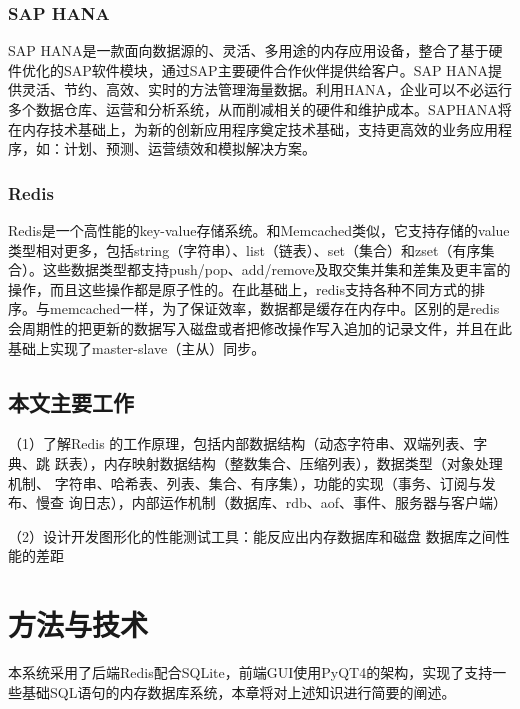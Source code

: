 \documentclass{zjutthesis}
\begin{document}
\subsection{SAP HANA}
SAP HANA是一款面向数据源的、灵活、多用途的内存应用设备，整合了基于硬件优化的SAP软件模块，通过SAP主要硬件合作伙伴提供给客户。SAP HANA提供灵活、节约、高效、实时的方法管理海量数据。利用HANA，企业可以不必运行多个数据仓库、运营和分析系统，从而削减相关的硬件和维护成本。SAPHANA将在内存技术基础上，为新的创新应用程序奠定技术基础，支持更高效的业务应用程序，如：计划、预测、运营绩效和模拟解决方案。

\subsection{Redis}
Redis是一个高性能的key-value存储系统。和Memcached类似，它支持存储的value类型相对更多，包括string（字符串）、list（链表）、set（集合）和zset（有序集合）。这些数据类型都支持push/pop、add/remove及取交集并集和差集及更丰富的操作，而且这些操作都是原子性的。在此基础上，redis支持各种不同方式的排序。与memcached一样，为了保证效率，数据都是缓存在内存中。区别的是redis会周期性的把更新的数据写入磁盘或者把修改操作写入追加的记录文件，并且在此基础上实现了master-slave（主从）同步。

\section{本文主要工作}
（1）了解Redis 的工作原理，包括内部数据结构（动态字符串、双端列表、字典、跳
跃表），内存映射数据结构（整数集合、压缩列表），数据类型（对象处理机制、
字符串、哈希表、列表、集合、有序集），功能的实现（事务、订阅与发布、慢查
询日志），内部运作机制（数据库、rdb、aof、事件、服务器与客户端）

（2）设计开发图形化的性能测试工具：能反应出内存数据库和磁盘
数据库之间性能的差距




\chapter{方法与技术}
本系统采用了后端Redis配合SQLite，前端GUI使用PyQT4的架构，实现了支持一些基础SQL语句的内存数据库系统，本章将对上述知识进行简要的阐述。
\end{document}
